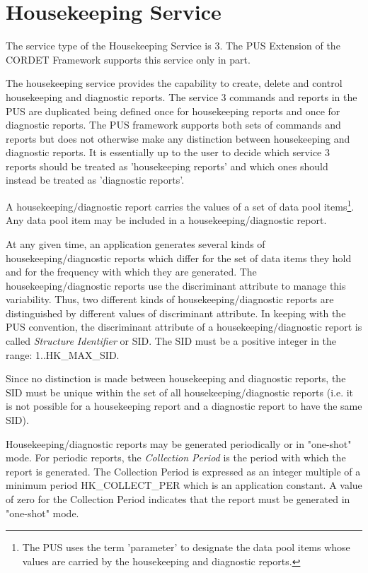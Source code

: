 \documentclass{pnp_article}
\begin{document}
\section{Housekeeping Service}\label{sec:serv3}
The service type of the Housekeeping Service is 3. The PUS Extension of the CORDET Framework supports this service only in part.

The housekeeping service provides the capability to create, delete and control housekeeping and diagnostic reports. The service 3 commands and reports in the PUS are duplicated being defined once for housekeeping reports and once for diagnostic reports. The PUS framework supports both sets of commands and reports but does not otherwise make any distinction between housekeeping and diagnostic reports. It is essentially up to the user to decide which service 3 reports should be treated as 'housekeeping reports' and which ones should instead be treated as 'diagnostic reports'.

A housekeeping/diagnostic report carries the values of a set of data pool items\footnote{The PUS uses the term 'parameter' to designate the data pool items whose values are carried by the housekeeping and diagnostic reports.}. Any data pool item may be included in a housekeeping/diagnostic report. 

At any given time, an application generates several kinds of housekeeping/diagnostic reports which differ for the set of data items they hold and for the frequency with which they are generated. The housekeeping/diagnostic reports use the discriminant attribute to manage this variability. Thus, two different kinds of housekeeping/diagnostic reports are distinguished by different values of discriminant attribute. In keeping with the PUS convention, the discriminant attribute of a housekeeping/diagnostic report is called \textit{Structure Identifier} or SID. The SID must be a positive integer in the range: 1..HK\_MAX\_SID.

Since no distinction is made between housekeeping and diagnostic reports, the SID must be unique within the set of all housekeeping/diagnostic reports (i.e. it is not possible for a housekeeping report and a diagnostic report to have the same SID).

Housekeeping/diagnostic reports may be generated periodically or in "one-shot" mode. For periodic reports, the \textit{Collection Period} is the period with which the report is generated. The Collection Period is expressed as an integer multiple of a minimum period HK\_COLLECT\_PER which is an application constant. A value of zero for the Collection Period indicates that the report must be generated in "one-shot" mode.
\end{document}

